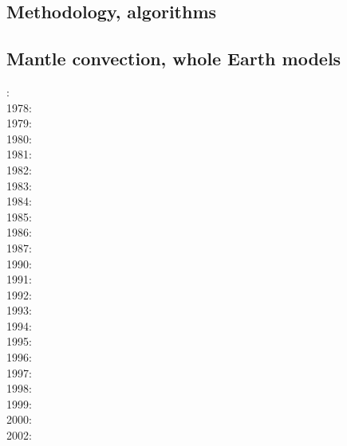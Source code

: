 \subsection*{Methodology, algorithms}

\cite{leka93}

\subsection*{Mantle convection, whole Earth models}

: \cite{hemw75}\\
1978: \cite{mahz78}\\
1979: \cite{ludt79}\cite{buss79}\\
1980: \cite{olco80}\cite{jamc80}\\
1981: \cite{buss81}\\
1982: \cite{jape82}\cite{homc82}\\
1983: \cite{hous83}\cite{hous83b}\cite{chri83}\\
1984: \cite{olyb84}\cite{jarv84}\cite{haeb84}\cite{harp84}\cite{davi84}\cite{boas84}\cite{chri84}
\cite{moca84}\\
1985: \cite{jarv85}\cite{baum85}\cite{chri85}\cite{csra85}\\
1986: \cite{davi86}\\
1987: \cite{yuqh87}\\
1990: \cite{trab90}\\
1991: \cite{chha91}\cite{mawe91}\\
1992: \cite{besg92}\cite{mayw92}\\
1993: \cite{zhch93}\cite{jarv93}\cite{tack93}\cite{bucc93}\cite{carm93}\\
1994: \cite{haeb94}\cite{chho94}\\
1995: \cite{zhgu95}\\
1996: \cite{zhyu96}\cite{hond96}\cite{rytr96a}\cite{rytr96b}\cite{tack96}\cite{trbo96}
\cite{birg96}\cite{burb96}\cite{kafo96}\\
1997: \cite{hond97}\cite{iwho97}\cite{burb97}\cite{mole97}\\
1998: \cite{ande98}\cite{iwho98}\cite{devv98}\cite{tack98}\cite{tack98b}\cite{trha98b}
\cite{trha98}\cite{burl98}\\
1999: \cite{duyr99}\\
2000: \cite{albe00}\cite{hayu00}\cite{devv00b}\cite{tack00b}\cite{zhzm00}\\
2002: \cite{tasu02}\cite{modm02}\\
